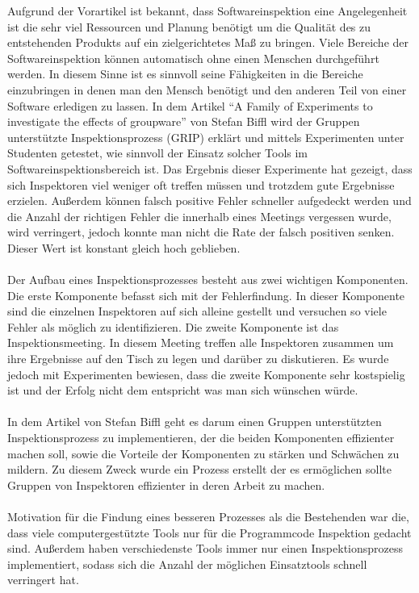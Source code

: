 \documentclass{llncs}
\begin{document}
Aufgrund der Vorartikel ist bekannt, dass Softwareinspektion eine Angelegenheit ist die sehr viel Ressourcen und Planung benötigt um die Qualität des zu entstehenden Produkts auf ein zielgerichtetes Maß zu bringen. Viele Bereiche der Softwareinspektion können automatisch ohne einen Menschen durchgeführt werden. In diesem Sinne ist es sinnvoll seine Fähigkeiten in die Bereiche einzubringen in denen man den Mensch benötigt und den anderen Teil von einer Software erledigen zu lassen. In dem Artikel “A Family of Experiments to investigate the effects of groupware” von Stefan Biffl wird der Gruppen unterstützte Inspektionsprozess (GRIP) erklärt und mittels Experimenten unter Studenten getestet, wie sinnvoll der Einsatz solcher Tools im Softwareinspektionsbereich ist. Das Ergebnis dieser Experimente hat gezeigt, dass sich Inspektoren viel weniger oft treffen müssen und trotzdem gute Ergebnisse erzielen. Außerdem können falsch positive Fehler schneller aufgedeckt werden und die Anzahl der richtigen Fehler die innerhalb eines Meetings vergessen wurde, wird verringert, jedoch konnte man nicht die Rate der falsch positiven senken. Dieser Wert ist konstant gleich hoch geblieben.
\\ \\
Der Aufbau eines Inspektionsprozesses besteht aus zwei wichtigen Komponenten. Die erste Komponente befasst sich mit der Fehlerfindung. In dieser Komponente sind die einzelnen Inspektoren auf sich alleine gestellt und versuchen so viele Fehler als möglich zu identifizieren. Die zweite Komponente ist das Inspektionsmeeting. In diesem Meeting treffen alle Inspektoren zusammen um ihre Ergebnisse auf den Tisch zu legen und darüber zu diskutieren. Es wurde jedoch mit Experimenten bewiesen, dass die zweite Komponente sehr kostspielig ist und der Erfolg nicht dem entspricht was man sich wünschen würde.
\\ \\
In dem Artikel von Stefan Biffl geht es darum einen Gruppen unterstützten Inspektionsprozess zu implementieren, der die beiden Komponenten effizienter machen soll, sowie die Vorteile der Komponenten zu stärken und Schwächen zu mildern. Zu diesem Zweck wurde ein Prozess erstellt der es ermöglichen sollte Gruppen von Inspektoren effizienter in deren Arbeit zu machen.
\\ \\
Motivation für die Findung eines besseren Prozesses als die Bestehenden war die, dass viele computergestützte Tools nur für die Programmcode Inspektion gedacht sind. Außerdem haben verschiedenste Tools immer nur einen Inspektionsprozess implementiert, sodass sich die Anzahl der möglichen Einsatztools schnell verringert hat.
\end{document}
